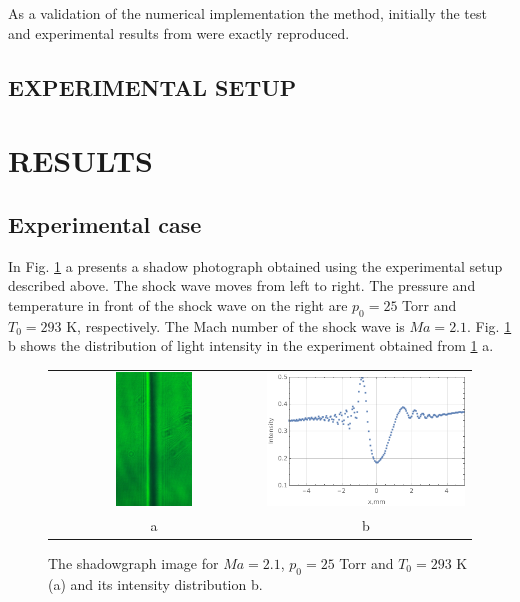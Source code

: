 \documentclass[letterpaper,11pt,oneside,reqno]{amsart}
\numberwithin{equation}{section}
\theoremstyle{definition}
\theoremstyle{qqq}
\begin{document}
As a validation of the numerical implementation the method, initially the test and experimental results from \cite{Pfeifer} were exactly reproduced.



\subsection{EXPERIMENTAL SETUP}


\section{RESULTS}

\subsection{Experimental case}

In Fig. \ref{Experiment_Ma2p1} a presents a shadow photograph obtained using the experimental setup described above. The shock wave moves from left to right. The pressure and temperature in front of the shock wave on the right are $p_0=25$ Torr and $T_0=293$ K, respectively. The Mach number of the shock wave is $Ma=2.1$. Fig. \ref{Experiment_Ma2p1} b shows the distribution of light intensity in the experiment obtained from \ref{Experiment_Ma2p1} a.

\begin{figure}
\begin{tabular}{cc}
    {\includegraphics[width=185pt, height=100pt]{Experiment_Ma2p1_foto.jpg}}
    &{\includegraphics[width=185pt,height=100pt]{2b.png}}\\ a&b
\end{tabular}
\caption{The shadowgraph image for $Ma=2.1$, $p_0=25$ Torr and $T_0=293$ K (a) and its intensity distribution {b}.}
\label{Experiment_Ma2p1}
\end{figure}
\end{document}
